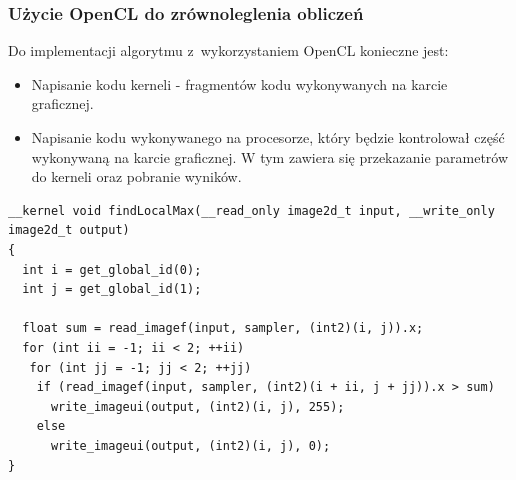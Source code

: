 \begin{frame}[fragile]
	\frametitle{Użycie OpenCL do zrównoleglenia obliczeń}
	\begin{tiny}
	Do implementacji algorytmu z~wykorzystaniem OpenCL konieczne jest:
	\begin{itemize}
		\item Napisanie kodu kerneli - fragmentów kodu wykonywanych na karcie graficznej.
		\item Napisanie kodu wykonywanego na procesorze, który będzie kontrolował część wykonywaną na karcie graficznej. W tym zawiera się przekazanie parametrów do kerneli oraz pobranie wyników.
	\end{itemize}
	\end{tiny}

	\lstset{language=C,label=lis:edgeDetector,breaklines=true,basicstyle=\tiny\ttfamily}
	\begin{lstlisting}
__kernel void findLocalMax(__read_only image2d_t input, __write_only image2d_t output)
{
  int i = get_global_id(0);
  int j = get_global_id(1);

  float sum = read_imagef(input, sampler, (int2)(i, j)).x;
  for (int ii = -1; ii < 2; ++ii)
   for (int jj = -1; jj < 2; ++jj)
    if (read_imagef(input, sampler, (int2)(i + ii, j + jj)).x > sum)
      write_imageui(output, (int2)(i, j), 255);
    else
      write_imageui(output, (int2)(i, j), 0);
}
\end{lstlisting}



\end{frame}


